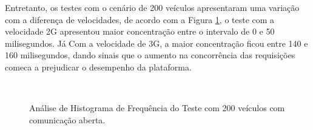 \documentclass[
	12pt,				%
	oneside,			%
	a4paper,			%
	english,			%
	brazil				%
	]{abntex2ppgsi}
\begin{document}
Entretanto, os testes com o cenário de 200 veículos apresentaram uma variação com a diferença de velocidades, de acordo com a Figura \ref{fig:imgHistFreq200}, o teste com a velocidade 2G apresentou maior concentração entre o intervalo de 0 e 50 milisegundos. Já Com a velocidade de 3G, a maior concentração ficou entre 140 e 160 milisegundos, dando sinais que o aumento na concorrência das requisições comeca a prejudicar o desempenho da plataforma.
 
\begin{figure}[h!]
	\caption{Análise de Histograma de Frequência do Teste  com 200 veículos com comunicação aberta.}
	\centering
	\label{fig:imgHistFreq200}
	\\
\end{figure}
\end{document}
